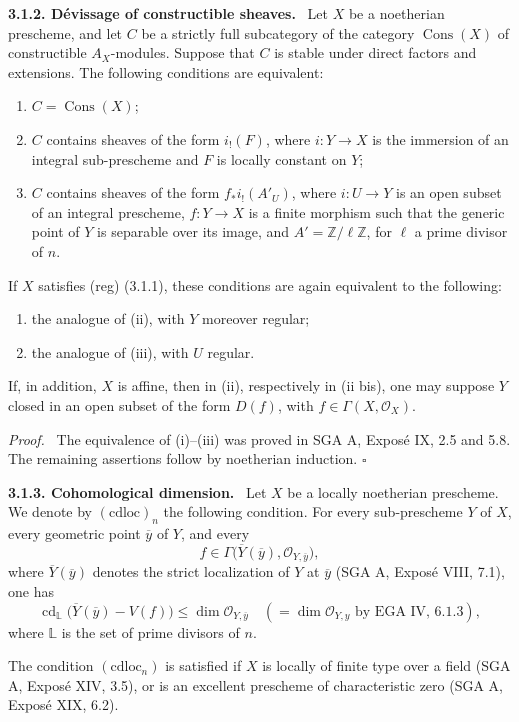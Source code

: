 \documentclass[11pt]{article}
\providecommand{\cO}{\mathcal{O}}
\providecommand{\qedtext}{\hfill$\square$}
\providecommand{\ZZ}{\mathbb{Z}}
\newenvironment{statement}[1]{\par\medskip\noindent\textbf{#1.}\ }{\par\medskip}
\newenvironment{prooftext}[1][Proof]{\par\noindent\emph{#1.}\ }{\par\medskip}
\DeclareMathOperator{\cd}{cd}
\newcommand{\ol}[1]{\overline{#1}}
\providecommand{\qedtext}{\hfill$\square$}
\begin{document}
\begin{statement}{3.1.2. Dévissage of constructible sheaves}
Let $X$ be a noetherian prescheme, and let $C$ be a strictly full subcategory of the category $\operatorname{Cons}(X)$ of constructible $A_X$-modules. Suppose that $C$ is stable under direct factors and extensions. The following conditions are equivalent:
\begin{enumerate}[label=(\roman*)]
\item $C=\operatorname{Cons}(X)$;
\item $C$ contains sheaves of the form $i_!(F)$, where $i:Y\to X$ is the immersion of an integral sub-prescheme and $F$ is locally constant on $Y$;
\item $C$ contains sheaves of the form $f_*i_!(A'_U)$, where $i:U\to Y$ is an open subset of an integral prescheme, $f:Y\to X$ is a finite morphism such that the generic point of $Y$ is separable over its image, and $A'=\ZZ/\ell\ZZ$, for $\ell$ a prime divisor of $n$.
\end{enumerate}
If $X$ satisfies (reg) (3.1.1), these conditions are again equivalent to the following:
\begin{enumerate}[label=(\roman* bis),start=2]
\item the analogue of (ii), with $Y$ moreover regular;
\item the analogue of (iii), with $U$ regular.
\end{enumerate}
If, in addition, $X$ is affine, then in (ii), respectively in (ii bis), one may suppose $Y$ closed in an open subset of the form $D(f)$, with $f\in \Gamma(X,\cO_X)$.
\end{statement}

\begin{prooftext}
The equivalence of (i)--(iii) was proved in SGA A, Exposé IX, 2.5 and 5.8. The remaining assertions follow by noetherian induction. \qedtext
\end{prooftext}

\begin{statement}{3.1.3. Cohomological dimension}
Let $X$ be a locally noetherian prescheme. We denote by $(\mathrm{cdloc})_n$ the following condition. For every sub-prescheme $Y$ of $X$, every geometric point $\ol y$ of $Y$, and every
\[
   f\in\Gamma\bigl(\ol Y(\ol y),\cO_{Y,\ol y}\bigr),
\]
where $\ol Y(\ol y)$ denotes the strict localization of $Y$ at $\ol y$ (SGA A, Exposé VIII, 7.1), one has
\[
   \cd_{\mathbb{L}}\bigl(\ol Y(\ol y)-V(f)\bigr)
       \le \dim \cO_{Y,\ol y}
       \quad (=\dim \cO_{Y,y}\text{ by EGA IV, 6.1.3}),
\]
where $\mathbb{L}$ is the set of prime divisors of $n$.

The condition $(\mathrm{cdloc}_n)$ is satisfied if $X$ is locally of finite type over a field (SGA A, Exposé XIV, 3.5), or is an excellent prescheme of characteristic zero (SGA A, Exposé XIX, 6.2).
\end{statement}
\end{document}

